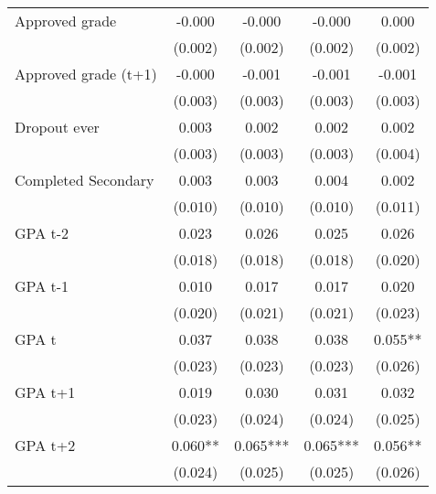 {{\begin{tabular}{lcccc}
Approved grade      &      -0.000   &      -0.000   &      -0.000   &       0.000   \\
                    &     (0.002)   &     (0.002)   &     (0.002)   &     (0.002)   \\
 
Approved grade (t+1)&      -0.000   &      -0.001   &      -0.001   &      -0.001   \\
                    &     (0.003)   &     (0.003)   &     (0.003)   &     (0.003)   \\
 
Dropout ever        &       0.003   &       0.002   &       0.002   &       0.002   \\
                    &     (0.003)   &     (0.003)   &     (0.003)   &     (0.004)   \\
 
Completed Secondary &       0.003   &       0.003   &       0.004   &       0.002   \\
                    &     (0.010)   &     (0.010)   &     (0.010)   &     (0.011)   \\
 
GPA t-2             &       0.023   &       0.026   &       0.025   &       0.026   \\
                    &     (0.018)   &     (0.018)   &     (0.018)   &     (0.020)   \\
 
GPA t-1             &       0.010   &       0.017   &       0.017   &       0.020   \\
                    &     (0.020)   &     (0.021)   &     (0.021)   &     (0.023)   \\
 
GPA t               &       0.037   &       0.038   &       0.038   &       0.055** \\
                    &     (0.023)   &     (0.023)   &     (0.023)   &     (0.026)   \\
 
GPA t+1             &       0.019   &       0.030   &       0.031   &       0.032   \\
                    &     (0.023)   &     (0.024)   &     (0.024)   &     (0.025)   \\
 
GPA t+2             &       0.060** &       0.065***&       0.065***&       0.056** \\
                    &     (0.024)   &     (0.025)   &     (0.025)   &     (0.026)   \\
 

\end{tabular}}}
